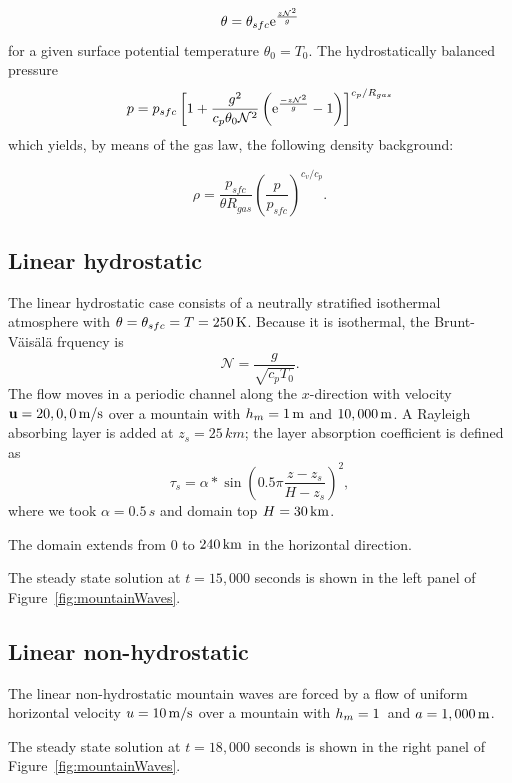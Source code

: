 \documentclass{report}
\begin{document}
\[
\theta = \theta_{sfc} {\rm e}^{\frac{z\mathcal{N}^2}{g}}
\]
for a given surface potential temperature $\theta_0 = T_0$. The hydrostatically balanced pressure 
\begin{equation}
    \label{eq:pressure_hs_brunt}
    p = p_{sfc}\left[ 1 + \frac{g^2}{c_p\theta_0\mathcal{N}^2}
    \left( {\rm e}^{\frac{-z\mathcal{N}^2}{g}} - 1 \right)  \right]^{c_p/R_{gas}}
\end{equation}
which yields, by means of the gas law, the following density background:

\begin{equation}
    \label{eq:pressure_hs_brunt}
    \rho = \frac{p_{sfc}}{\theta R_{gas}}\left(\frac{p}{p_{sfc}}\right)^{c_v/c_p}.
\end{equation}

\subsection{Linear hydrostatic}
The linear hydrostatic case consists of a neutrally stratified isothermal atmosphere with $\theta=\theta_{sfc} = T=250\,{\rm K}$. Because it is isothermal, the Brunt-V\"ais\"al\"a frquency is 
\[
\mathcal{N} = \frac{g}{\sqrt{c_p T_0}}.
\]
The flow moves in a periodic channel along the $x$-direction with velocity ${\bf u}={20, 0, 0}\,{\rm m/s}$ over a mountain with $h_m=1\,{\rm m}$ and $10,000\,{\rm m}$. A Rayleigh absorbing layer is added at $z_s=25\,{km}$; the layer absorption coefficient is defined as 
\[
\tau_s = \alpha * \sin\left(0.5\pi \frac{z - z_s}{H - z_s} \right)^2,
\]
where we took $\alpha=0.5\,{s}$ and domain top $H=30\,{\rm km}$.

The domain extends from $0$ to $240\,{\rm km}$ in the horizontal direction. 

The steady state solution at $t=15,000$ seconds is shown in the left panel of Figure~\ref{fig:mountainWaves}.

\subsection{Linear non-hydrostatic}
The linear non-hydrostatic mountain waves are forced by a flow of uniform horizontal velocity $u=10\,{\rm m/s}$ over a mountain with $h_m=1\,{\rm}$ and $a=1,000\,{\rm m}$.


The steady state solution at $t=18,000$ seconds is shown in the right panel of Figure~\ref{fig:mountainWaves}.
\end{document}
